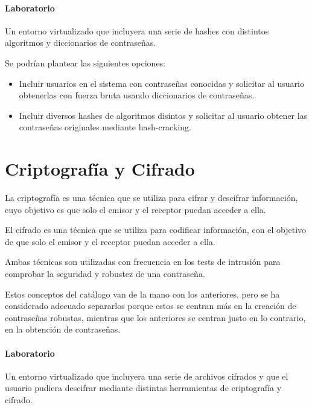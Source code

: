         \paragraph{Laboratorio}

            Un entorno virtualizado que incluyera una serie de hashes con distintos algoritmos y diccionarios de contraseñas.

            Se podrían plantear las siguientes opciones:
            
            \begin{itemize}
                \item Incluir usuarios en el sistema con contraseñas conocidas y solicitar al usuario obtenerlas con fuerza bruta usando diccionarios de contraseñas.
                \item Incluir diversos hashes de algoritmos disintos y solicitar al usuario obtener las contraseñas originales mediante hash-cracking.
            \end{itemize}


    \section{Criptografía y Cifrado}

        La criptografía es una técnica que se utiliza para cifrar y descifrar información, cuyo objetivo es que solo el emisor y el receptor puedan acceder a ella.

        El cifrado es una técnica que se utiliza para codificar información, con el objetivo de que solo el emisor y el receptor puedan acceder a ella.

        Ambas técnicas son utilizadas con frecuencia en los tests de intrusión para comprobar la seguridad y robustez de una contraseña.

        Estos conceptos del catálogo van de la mano con los anteriores, pero se ha considerado adecuado separarlos porque estos se centran más en la creación de contraseñas robustas, mientras que los anteriores se centran justo en lo contrario, en la obtención de contraseñas. 

        \paragraph{Laboratorio}

            Un entorno virtualizado que incluyera una serie de archivos cifrados y que el usuario pudiera descifrar mediante distintas herramientas de criptografía y cifrado.


